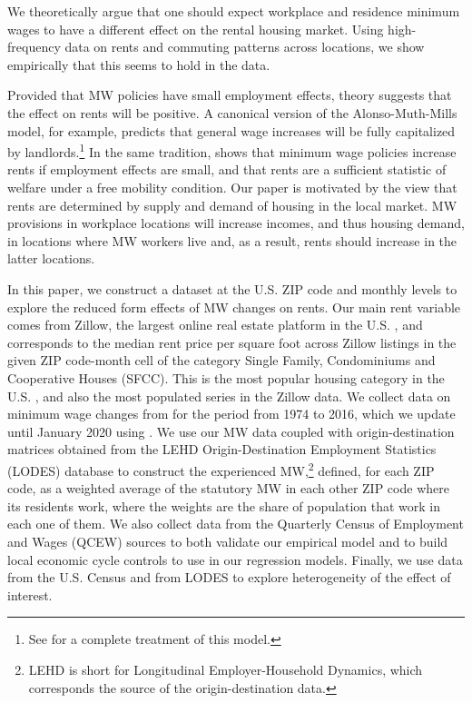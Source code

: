 
We theoretically argue that one should expect workplace and residence minimum wages
to have a different effect on the rental housing market.
Using high-frequency data on rents and commuting patterns across locations, we show 
empirically that this seems to hold in the data.

Provided that MW policies have small employment effects, theory suggests that the 
effect on rents will be positive. 
A canonical version of the Alonso-Muth-Mills model, for example, predicts that general 
wage increases will be fully capitalized by landlords.\footnote{See 
	\textcite{Brueckner1987} for a complete treatment of this model.} 
In the same tradition, \textcite{Yamagishi2021} shows that minimum wage policies increase 
rents if employment effects are small, and that rents are a sufficient statistic of 
welfare under a free mobility condition. 
Our paper is motivated by the view that rents are determined by supply and demand of 
housing in the local market. MW provisions in workplace locations will increase incomes, 
and thus housing demand, in locations where MW workers live and, as a result, rents 
should increase in the latter locations.
 
In this paper, we construct a dataset at the U.S. ZIP code and monthly levels to 
explore the reduced form effects of MW changes on rents. Our main rent variable comes 
from Zillow, the largest online real estate platform in the U.S. 
\parencite{realestateagentpdx, investopedia}, and corresponds to the median rent price 
per square foot across Zillow listings in the given ZIP code-month cell of the category 
Single Family, Condominiums and Cooperative Houses (SFCC).
This is the most popular housing category in the U.S. \parencite{fernald2020americas}, 
and also the most populated series in the Zillow data.
We collect data on minimum wage changes from \textcite{VaghulZipperer2016} for the period 
from 1974 to 2016, which we update until January 2020 using 
\textcite{BerkeleyLaborCenter}. 
We use our MW data coupled with origin-destination matrices obtained from the LEHD 
Origin-Destination Employment Statistics (LODES) database to construct the experienced 
MW,\footnote{LEHD is short for Longitudinal Employer-Household 		
	Dynamics, which corresponds the source of the origin-destination data.}
defined, for each ZIP code, as a weighted average of the statutory MW in each other ZIP 
code where its residents work, where the weights are the share of population that work 
in each one of them.
We also collect data from the Quarterly Census of Employment and Wages (QCEW) sources 
to both validate our empirical model and to build local economic cycle controls 
to use in our regression models. Finally, we use data from the U.S. Census and from 
LODES to explore heterogeneity of the effect of interest.

